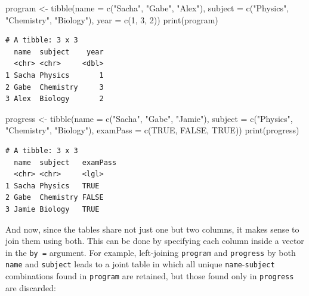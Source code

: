 \documentclass[
  letterpaper,
  DIV=11,
  numbers=noendperiod]{scrreprt}
\newenvironment{Shaded}{\begin{snugshade}}{\end{snugshade}}
\newcommand{\AttributeTok}[1]{\textcolor[rgb]{0.40,0.45,0.13}{#1}}
\newcommand{\ConstantTok}[1]{\textcolor[rgb]{0.56,0.35,0.01}{#1}}
\newcommand{\DecValTok}[1]{\textcolor[rgb]{0.68,0.00,0.00}{#1}}
\newcommand{\FunctionTok}[1]{\textcolor[rgb]{0.28,0.35,0.67}{#1}}
\newcommand{\NormalTok}[1]{\textcolor[rgb]{0.00,0.23,0.31}{#1}}
\newcommand{\OtherTok}[1]{\textcolor[rgb]{0.00,0.23,0.31}{#1}}
\newcommand{\StringTok}[1]{\textcolor[rgb]{0.13,0.47,0.30}{#1}}
\begin{document}
\begin{Shaded}
\begin{Highlighting}[]
\NormalTok{program  }\OtherTok{\textless{}{-}} \FunctionTok{tibble}\NormalTok{(}\AttributeTok{name     =} \FunctionTok{c}\NormalTok{(}\StringTok{"Sacha"}\NormalTok{, }\StringTok{"Gabe"}\NormalTok{, }\StringTok{"Alex"}\NormalTok{),}
                   \AttributeTok{subject  =} \FunctionTok{c}\NormalTok{(}\StringTok{"Physics"}\NormalTok{, }\StringTok{"Chemistry"}\NormalTok{, }\StringTok{"Biology"}\NormalTok{),}
                   \AttributeTok{year     =} \FunctionTok{c}\NormalTok{(}\DecValTok{1}\NormalTok{, }\DecValTok{3}\NormalTok{, }\DecValTok{2}\NormalTok{))}
\FunctionTok{print}\NormalTok{(program)}
\end{Highlighting}
\end{Shaded}

\begin{verbatim}
# A tibble: 3 x 3
  name  subject    year
  <chr> <chr>     <dbl>
1 Sacha Physics       1
2 Gabe  Chemistry     3
3 Alex  Biology       2
\end{verbatim}

\begin{Shaded}
\begin{Highlighting}[]
\NormalTok{progress }\OtherTok{\textless{}{-}} \FunctionTok{tibble}\NormalTok{(}\AttributeTok{name     =} \FunctionTok{c}\NormalTok{(}\StringTok{"Sacha"}\NormalTok{, }\StringTok{"Gabe"}\NormalTok{, }\StringTok{"Jamie"}\NormalTok{),}
                   \AttributeTok{subject  =} \FunctionTok{c}\NormalTok{(}\StringTok{"Physics"}\NormalTok{, }\StringTok{"Chemistry"}\NormalTok{, }\StringTok{"Biology"}\NormalTok{),}
                   \AttributeTok{examPass =} \FunctionTok{c}\NormalTok{(}\ConstantTok{TRUE}\NormalTok{, }\ConstantTok{FALSE}\NormalTok{, }\ConstantTok{TRUE}\NormalTok{))}
\FunctionTok{print}\NormalTok{(progress)}
\end{Highlighting}
\end{Shaded}

\begin{verbatim}
# A tibble: 3 x 3
  name  subject   examPass
  <chr> <chr>     <lgl>   
1 Sacha Physics   TRUE    
2 Gabe  Chemistry FALSE   
3 Jamie Biology   TRUE    
\end{verbatim}

And now, since the tables share not just one but two columns, it makes
sense to join them using both. This can be done by specifying each
column inside a vector in the \texttt{by\ =} argument. For example,
left-joining \texttt{program} and \texttt{progress} by both
\texttt{name} and \texttt{subject} leads to a joint table in which all
unique \texttt{name}-\texttt{subject} combinations found in
\texttt{program} are retained, but those found only in \texttt{progress}
are discarded:
\end{document}

